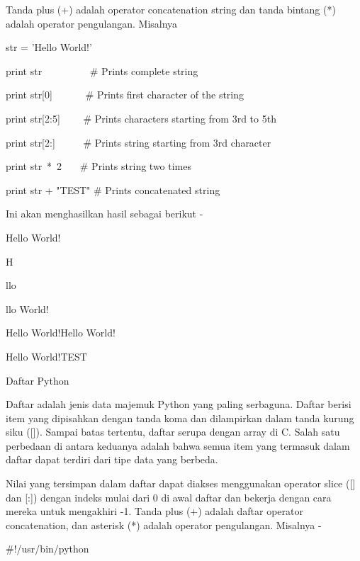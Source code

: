 \noindent 
Tanda plus (+) adalah operator concatenation string dan tanda bintang (*) adalah operator pengulangan. $  $Misalnya  \par
\vspace{12pt}
\vspace{12pt}
\noindent 
str = 'Hello World!' \par
\vspace{12pt}
\noindent 
print str~~~~~~~~~  $  \#  $ Prints complete string \par
\noindent 
print str[0]~~~~~~  $  \#  $ Prints first character of the string \par
\noindent 
print str[2:5]~~~~  $  \#  $ Prints characters starting from 3rd to 5th \par
\noindent 
print str[2:]~~~~~  $  \#  $ Prints string starting from 3rd character \par
\noindent 
print str~*~2~~~    $  \#  $ Prints string two times \par
\noindent 
print str + "TEST"  $  \#  $ Prints concatenated string \par
\noindent 
Ini akan menghasilkan hasil sebagai berikut - \par
\noindent 
Hello World! \par
\noindent 
H \par
\noindent 
llo \par
\noindent 
llo World! \par
\noindent 
Hello World!Hello World! \par
\noindent 
Hello World!TEST \par
\noindent 
Daftar Python \par
\noindent 
Daftar adalah jenis data majemuk Python yang paling serbaguna. $  $Daftar berisi item yang dipisahkan dengan tanda koma dan dilampirkan dalam tanda kurung siku ([]). $  $Sampai batas tertentu, daftar serupa dengan array di C. Salah satu perbedaan di antara keduanya adalah bahwa semua item yang termasuk dalam daftar dapat terdiri dari tipe data yang berbeda. \par
\noindent 
Nilai yang tersimpan dalam daftar dapat diakses menggunakan operator slice ([] dan [:]) dengan indeks mulai dari 0 di awal daftar dan bekerja dengan cara mereka untuk mengakhiri -1. $  $Tanda plus (+) adalah daftar operator concatenation, dan asterisk (*) adalah operator pengulangan. $  $Misalnya - \par
\noindent 
 $  \#  $!/usr/bin/python \par
\vspace{12pt}
